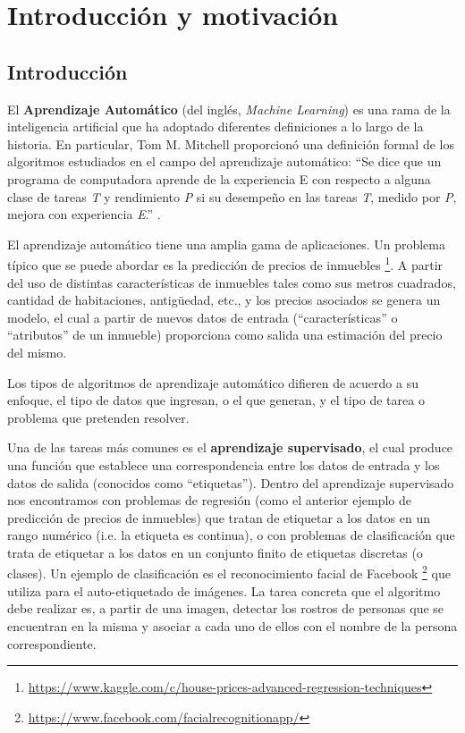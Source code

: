 \chapter{Introducción y motivación}

\section{Introducción}

El \textbf{Aprendizaje Automático} (del inglés, \textit{Machine Learning}) es una rama de la inteligencia artificial que ha adoptado diferentes definiciones a lo largo de la historia. En particular, Tom M. Mitchell proporcionó una definición formal de los algoritmos estudiados en el campo del aprendizaje automático: ``Se dice que un programa de computadora aprende de la experiencia E con respecto a alguna clase de tareas \textit{T} y rendimiento \textit{P} si su desempeño en las tareas \textit{T}, medido por \textit{P}, mejora con experiencia \textit{E}.'' \cite{Mitchell:1997:ML:541177}.

El aprendizaje automático tiene una amplia gama de aplicaciones. Un problema típico que se puede abordar es la predicción de precios de inmuebles \footnote{\url{https://www.kaggle.com/c/house-prices-advanced-regression-techniques}}. A partir del uso de distintas características de inmuebles tales como sus metros cuadrados, cantidad de habitaciones, antigüedad, etc., y los precios asociados se genera un modelo, el cual a partir de nuevos datos de entrada (``características'' o ``atributos'' de un inmueble) proporciona como salida una estimación del precio del mismo.

Los tipos de algoritmos de aprendizaje automático difieren de acuerdo a su enfoque, el tipo de datos que ingresan, o el que generan, y el tipo de tarea o problema que pretenden resolver.

Una de las tareas más comunes es el \textbf{aprendizaje supervisado}, el cual produce una función que establece una correspondencia entre los datos de entrada y los datos de salida (conocidos como ``etiquetas''). Dentro del aprendizaje supervisado nos encontramos con problemas de regresión (como el anterior ejemplo de predicción de precios de inmuebles) que tratan de etiquetar a los datos en un rango numérico (i.e. la etiqueta es continua), o 
con problemas de clasificación que trata de etiquetar a los datos en un conjunto finito de etiquetas discretas (o clases). Un ejemplo de clasificación es el reconocimiento facial de Facebook \footnote{\url{https://www.facebook.com/facialrecognitionapp/}} que utiliza para el auto-etiquetado de imágenes. La tarea concreta que el algoritmo debe realizar es, a partir de una imagen, detectar los rostros de personas que se encuentran en la misma y asociar a cada uno de ellos con el nombre de la persona correspondiente.

